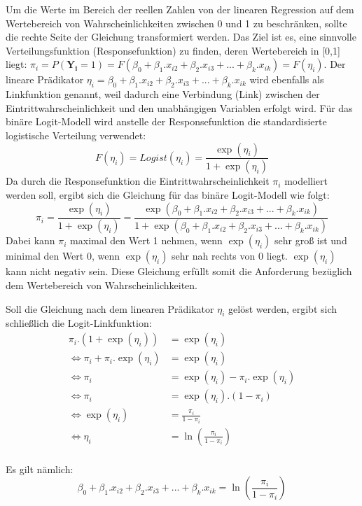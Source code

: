 \documentclass[12pt,]{article}
\begin{document}
Um die Werte im Bereich der reellen Zahlen von der linearen Regression
auf dem Wertebereich von Wahrscheinlichkeiten zwischen 0 und 1 zu
beschränken, sollte die rechte Seite der Gleichung transformiert werden.
Das Ziel ist es, eine sinnvolle Verteilungsfunktion (Responsefunktion)
zu finden, deren Wertebereich in {[}0,1{]} liegt:
\(\pi_i = P(\mathbf{Y_i} = 1) = F(\beta_0 + \beta_1.x_{i2} + \beta_2.x_{i3} + ... + \beta_k.x_{ik}) = F(\eta_i)\).
Der lineare Prädikator
\(\eta_i = \beta_0 + \beta_1.x_{i2} + \beta_2.x_{i3} + ... + \beta_k.x_{ik}\)
wird ebenfalls als Linkfunktion genannt, weil dadurch eine Verbindung
(Link) zwischen der Eintrittwahrscheinlichkeit und den unabhängigen
Variablen erfolgt wird. Für das binäre Logit-Modell wird anstelle der
Responsefunktion die standardisierte logistische Verteilung verwendet:
\[
F(\eta_i) = Logist(\eta_i) = \frac{\exp(\eta_i)}{1 + \exp(\eta_i)} 
\] Da durch die Responsefunktion die Eintrittwahrscheinlichkeit
\(\pi_i\) modelliert werden soll, ergibt sich die Gleichung für das
binäre Logit-Modell wie folgt: \[
\pi_i = \frac{\exp(\eta_i)}{1 + \exp(\eta_i)} = \frac{\exp(\beta_0 + \beta_1.x_{i2} + \beta_2.x_{i3} + ... + \beta_k.x_{ik})}{1 + \exp(\beta_0 + \beta_1.x_{i2} + \beta_2.x_{i3} + ... + \beta_k.x_{ik})}
\] Dabei kann \(\pi_i\) maximal den Wert 1 nehmen, wenn \(\exp(\eta_i)\)
sehr groß ist und minimal den Wert 0, wenn \(\exp(\eta_i)\) sehr nah
rechts von 0 liegt. \(\exp(\eta_i)\) kann nicht negativ sein. Diese
Gleichung erfüllt somit die Anforderung bezüglich dem Wertebereich von
Wahrscheinlichkeiten.

Soll die Gleichung nach dem linearen Prädikator \(\eta_i\) gelöst
werden, ergibt sich schließlich die Logit-Linkfunktion: \[
\begin{aligned}
\pi_i.(1 + \exp(\eta_i)) &= \exp(\eta_i) \\
\Leftrightarrow \pi_i + \pi_i.\exp(\eta_i) &= \exp(\eta_i) \\
\Leftrightarrow \pi_i &= \exp(\eta_i) - \pi_i.\exp(\eta_i)  \\
\Leftrightarrow \pi_i &= \exp(\eta_i).(1-\pi_i) \\
\Leftrightarrow \exp(\eta_i) &= \frac{\pi_i}{1-\pi_i} \\
\Leftrightarrow \eta_i &= \ln(\frac{\pi_i}{1-\pi_i}) \\
\end{aligned}
\]

Es gilt nämlich: \[
\beta_0 + \beta_1.x_{i2} + \beta_2.x_{i3} + ... + \beta_k.x_{ik} = \ln(\frac{\pi_i}{1-\pi_i})
\]
\end{document}

